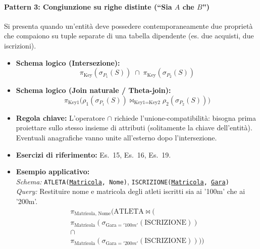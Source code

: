 \documentclass[12pt]{extarticle}
\begin{document}
\paragraph{Pattern 3: Congiunzione su righe distinte (``Sia $A$ che $B$'')}
Si presenta quando un'entità deve possedere contemporaneamente due proprietà che compaiono su tuple separate di una tabella dipendente (es. due acquisti, due iscrizioni).
\begin{itemize}
    \item \textbf{Schema logico (Intersezione):}
    \[
    \pi_{\text{Key}}(\sigma_{P_1}(S)) \;\cap\; \pi_{\text{Key}}(\sigma_{P_2}(S))
    \]
    \item \textbf{Schema logico (Join naturale / Theta-join):}
    \[
    \pi_{\text{Key1}} \big( \rho_1(\sigma_{P_1}(S)) \bowtie_{\text{Key1} = \text{Key2}} \rho_2(\sigma_{P_2}(S)) \big)
    \]
    \item \textbf{Regola chiave:} L'operatore $\cap$ richiede l'unione-compatibilità: bisogna prima proiettare sullo stesso insieme di attributi (solitamente la chiave dell'entità). Eventuali anagrafiche vanno unite all'esterno dopo l'intersezione.
    \item \textbf{Esercizi di riferimento:} Es.~15, Es.~16, Es.~19.
    \item \textbf{Esempio applicativo:}\\
    \textit{Schema:} \texttt{ATLETA(\underline{Matricola}, Nome)}, \texttt{ISCRIZIONE(\underline{Matricola}, \underline{Gara})}\\
    \textit{Query:} Restituire nome e matricola degli atleti iscritti sia ai '100m' che ai '200m'.
    \[
    \begin{gathered}
    \pi_{\text{Matricola, Nome}} \Big( \text{ATLETA} \bowtie \Big( \\
    \pi_{\text{Matricola}}(\sigma_{\text{Gara} = '100m'}(\text{ISCRIZIONE})) \\
    \cap \\
    \pi_{\text{Matricola}}(\sigma_{\text{Gara} = '200m'}(\text{ISCRIZIONE})) \Big) \Big)
    \end{gathered}
    \]
\end{itemize}

\end{document}
